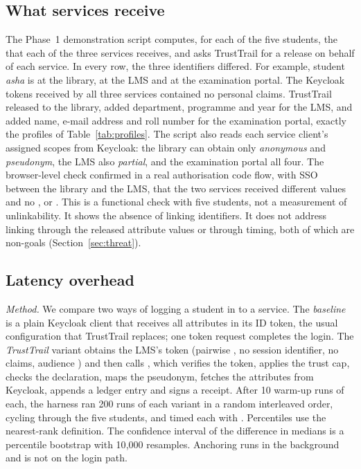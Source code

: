 \subsection{What services receive}
\label{sec:eval-functional}
The Phase~1 demonstration script computes, for each of the five students, the  that each of the three services receives, and asks TrustTrail for a release on behalf of each service. In every row, the three identifiers differed. For example, student \emph{asha} is  at the library,  at the LMS and  at the examination portal. The Keycloak tokens received by all three services contained no personal claims. TrustTrail released  to the library, added department, programme and year for the LMS, and added name, e-mail address and roll number for the examination portal, exactly the profiles of Table~\ref{tab:profiles}. The script also reads each service client's assigned scopes from Keycloak: the library can obtain only \emph{anonymous} and \emph{pseudonym}, the LMS also \emph{partial}, and the examination portal all four. The browser-level check confirmed in a real authorisation code flow, with SSO between the library and the LMS, that the two services received different  values and no ,  or . This is a functional check with five students, not a measurement of unlinkability. It shows the absence of linking identifiers. It does not address linking through the released attribute values or through timing, both of which are non-goals (Section~\ref{sec:threat}).

\subsection{Latency overhead}
\label{sec:eval-latency}
\emph{Method.} We compare two ways of logging a student in to a service. The \emph{baseline} is a plain Keycloak client that receives all attributes in its ID token, the usual configuration that TrustTrail replaces; one token request completes the login. The \emph{TrustTrail} variant obtains the LMS's token (pairwise , no session identifier, no claims, audience ) and then calls , which verifies the token, applies the trust cap, checks the declaration, maps the pseudonym, fetches the attributes from Keycloak, appends a ledger entry and signs a receipt. After 10 warm-up runs of each, the harness ran 200 runs of each variant in a random interleaved order, cycling through the five students, and timed each with . Percentiles use the nearest-rank definition. The confidence interval of the difference in medians is a percentile bootstrap with 10{,}000 resamples. Anchoring runs in the background and is not on the login path.

